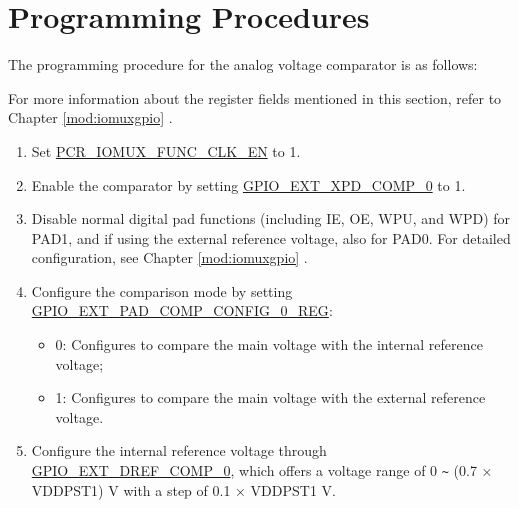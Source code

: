 \documentclass[main\_\_EN.tex]{subfiles}
\begin{document}

\section{Programming Procedures}
\label{sec:anacom-prog-procedures}

The programming procedure for the analog voltage comparator is as follows:

\begin{tiplisting}
For more information about the register fields mentioned in this section, refer to Chapter \ref{mod:iomuxgpio} \textit{}.
\end{tiplisting}

\begin{enumerate}
    \item Set \hyperref[fielddesc:PCRIOMUXFUNCCLKEN]{PCR\_IOMUX\_FUNC\_CLK\_EN} to 1.
    \item Enable the comparator by setting \hyperref[fielddesc:GPIOEXTXPDCOMP0]{GPIO\_EXT\_XPD\_COMP\_0} to 1.
    \item Disable normal digital pad functions (including IE, OE, WPU, and WPD) for PAD1, and if using the external reference voltage, also for PAD0. For detailed configuration, see Chapter \ref{mod:iomuxgpio} .
    \item Configure the comparison mode by setting \hyperref[regdesc:GPIOEXTPADCOMPCONFIG0REG]{GPIO\_EXT\_PAD\_COMP\_CONFIG\_0\_REG}:
        \begin{itemize}
            \item 0: Configures to compare the main voltage with the internal reference voltage;
            \item 1: Configures to compare the main voltage with the external reference voltage.
        \end{itemize}
    \item Configure the internal reference voltage through \hyperref[fielddesc:GPIOEXTDREFCOMP0]{GPIO\_EXT\_DREF\_COMP\_0}, which offers a voltage range of 0 \verb+~+ (0.7 × VDDPST1) V with a step of 0.1 × VDDPST1 V.
\end{enumerate}
\end{document}
